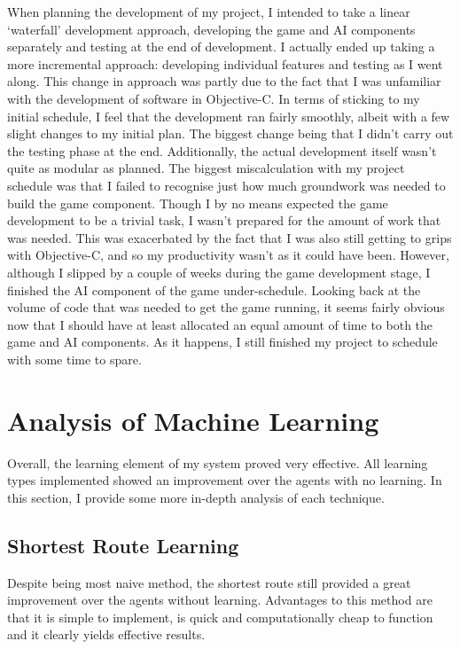 \documentclass[a4paper,oneside]{report}
\begin{document}
When planning the development of my project, I intended to take a linear `waterfall' development approach, developing the game and AI components separately and testing at the end of development. I actually ended up taking a more incremental approach: developing individual features and testing as I went along. This change in approach was partly due to the fact that I was unfamiliar with the development of software in Objective-C. In terms of sticking to my initial schedule, I feel that the development ran fairly smoothly, albeit with a few slight changes to my initial plan. The biggest change being that I didn't carry out the testing phase at the end. Additionally, the actual development itself wasn't quite as modular as planned. The biggest miscalculation with my project schedule was that I failed to recognise just how much groundwork was needed to build the game component. Though I by no means expected the game development to be a trivial task, I wasn't prepared for the amount of work that was needed. This was exacerbated by the fact that I was also still getting to grips with Objective-C, and so my productivity wasn't as it could have been. However, although I slipped by a couple of weeks during the game development stage, I finished the AI component of the game under-schedule. Looking back at the volume of code that was needed to get the game running, it seems fairly obvious now that I should have at least allocated an equal amount of time to both the game and AI components. As it happens, I still finished my project to schedule with some time to spare.

\section{Analysis of Machine Learning}

Overall, the learning element of my system proved very effective. All learning types implemented showed an improvement over the agents with no learning. In this section, I provide some more in-depth analysis of each technique.

\subsection{Shortest Route Learning}

Despite being most naive method, the shortest route still provided a great improvement over the agents without learning. Advantages to this method are that it is simple to implement, is quick and computationally cheap to function and it clearly yields effective results. 
\end{document}
